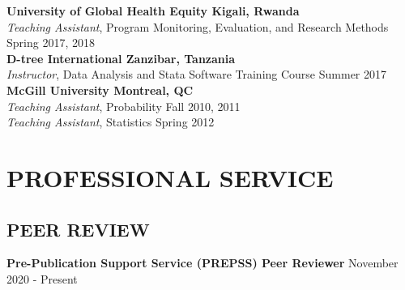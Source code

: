 \documentclass[12pt]{article}
\begin{document}
\textbf{University of Global Health Equity \hfill \hfill Kigali, Rwanda} \\
\textit{Teaching Assistant}, Program Monitoring, Evaluation, and Research Methods  \hfill \hfill Spring 2017, 2018 \\

\textbf{D-tree International \hfill \hfill Zanzibar, Tanzania}\\
\textit{Instructor}, Data Analysis and Stata Software Training Course \hfill \hfill Summer 2017  \\

\textbf{McGill University \hfill \hfill Montreal, QC}\\
\textit{Teaching Assistant}, Probability \hfill \hfill Fall 2010, 2011 \\
\textit{Teaching Assistant}, Statistics \hfill \hfill Spring 2012 

%

\section*{\textbf{{\large P}{ROFESSIONAL} {\large S}{ERVICE}}}


\subsection*{\textbf{PEER REVIEW}}

\textbf{Pre-Publication Support Service (PREPSS) Peer Reviewer} \hfill \hfill November 2020 - Present\\
\end{document}
